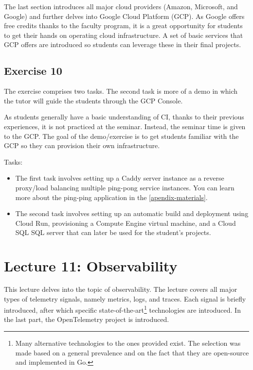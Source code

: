 \documentclass[
  digital,
  color,
  oneside,
  nosansbold,
  nocolorbold,
  lof,
  nolot,
]{fithesis4}
\begin{document}
The last section introduces all major cloud providers (Amazon, Microsoft, and Google) and further delves into Google Cloud Platform (GCP)\cite{gcp}. As Google offers free credits thanks to the faculty program\cite{gcp-faculty}, it is a great opportunity for students to get their hands on operating cloud infrastructure. A set of basic services that GCP offers are introduced so students can leverage these in their final projects.

\subsection{Exercise 10}

The exercise comprises two tasks. The second task is more of a demo in which the tutor will guide the students through the GCP Console.

As students generally have a basic understanding of CI, thanks to their previous experiences, it is not practiced at the seminar. Instead, the seminar time is given to the GCP. The goal of the demo/exercise is to get students familiar with the GCP so they can provision their own infrastructure.

Tasks:
\begin{itemize}
    \item The first task involves setting up a Caddy server instance as a reverse proxy/load balancing multiple ping-pong service instances. You can learn more about the ping-ping application in the \cref{apendix-materials}.
    \item The second task involves setting up an automatic build and deployment using Cloud Run\cite{gcp-cloud-run}, provisioning a Compute Engine\cite{gcp-cloud-compute} virtual machine, and a Cloud SQL SQL\cite{gcp-cloud-sql} server that can later be used for the student's projects.
\end{itemize}
    
\section{Lecture 11: Observability}\label{lecture-observability}

This lecture delves into the topic of observability. The lecture covers all major types of telemetry signals, namely metrics, logs, and traces. Each signal is briefly introduced, after which specific state-of-the-art\footnote{Many alternative technologies to the ones provided exist. The selection was made based on a general prevalence and on the fact that they are open-source and implemented in Go.}
technologies are introduced. In the last part, the OpenTelemetry\cite{open-telemetry} project is introduced.
\end{document}

